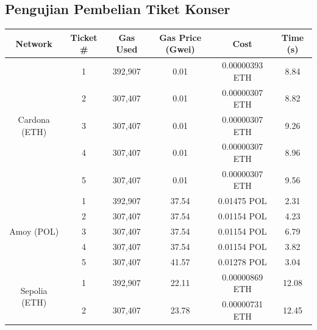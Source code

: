 \subsection{Pengujian Pembelian Tiket Konser}
\begin{table}[h]
  \centering
  \begin{tabular}{|c|c|c|c|c|c|}
    \hline
    \textbf{Network} & \textbf{Ticket \#} & \textbf{Gas Used} & \textbf{Gas Price (Gwei)} & \textbf{Cost}  & \textbf{Time (s)} \\
    \hline
    \multirow{5}{*}{Cardona (ETH)}
                     & 1                  & 392,907           & 0.01                      & 0.00000393 ETH & 8.84              \\
                     & 2                  & 307,407           & 0.01                      & 0.00000307 ETH & 8.82              \\
                     & 3                  & 307,407           & 0.01                      & 0.00000307 ETH & 9.26              \\
                     & 4                  & 307,407           & 0.01                      & 0.00000307 ETH & 8.96              \\
                     & 5                  & 307,407           & 0.01                      & 0.00000307 ETH & 9.56              \\
    \hline
    \multirow{5}{*}{Amoy (POL)}
                     & 1                  & 392,907           & 37.54                     & 0.01475 POL    & 2.31              \\
                     & 2                  & 307,407           & 37.54                     & 0.01154 POL    & 4.23              \\
                     & 3                  & 307,407           & 37.54                     & 0.01154 POL    & 6.79              \\
                     & 4                  & 307,407           & 37.54                     & 0.01154 POL    & 3.82              \\
                     & 5                  & 307,407           & 41.57                     & 0.01278 POL    & 3.04              \\
    \hline
    \multirow{5}{*}{Sepolia (ETH)}
                     & 1                  & 392,907           & 22.11                     & 0.00000869 ETH & 12.08             \\
                     & 2                  & 307,407           & 23.78                     & 0.00000731 ETH & 12.45             \\

\end{tabular}
\end{table}
